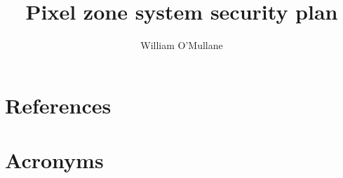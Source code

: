 \documentclass[OPS,authoryear,toc]{lsstdoc}
\title{Pixel zone system security plan}
\author{%
William O'Mullane
}
\date{\vcsDate}
\begin{document}
\maketitle


\appendix
\section{References} \label{sec:bib}
\renewcommand{\refname}{} %


\section{Acronyms} \label{sec:acronyms}

\end{document}
